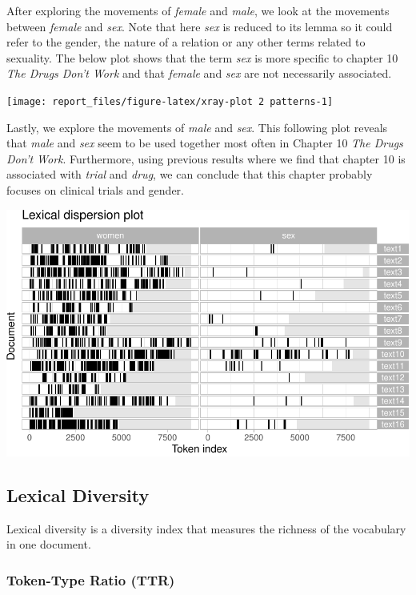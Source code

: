 \documentclass[
]{article}
\begin{document}
After exploring the movements of \emph{female} and \emph{male}, we look
at the movements between \emph{female} and \emph{sex}. Note that here
\emph{sex} is reduced to its lemma so it could refer to the gender, the
nature of a relation or any other terms related to sexuality. The below
plot shows that the term \emph{sex} is more specific to chapter 10
\emph{The Drugs Don't Work} and that \emph{female} and \emph{sex} are
not necessarily associated.

\begin{center}\texttt{[image: report\_files/figure-latex/xray-plot 2 patterns-1]} \end{center}

Lastly, we explore the movements of \emph{male} and \emph{sex}. This
following plot reveals that \emph{male} and \emph{sex} seem to be used
together most often in Chapter 10 \emph{The Drugs Don't Work}.
Furthermore, using previous results where we find that chapter 10 is
associated with \emph{trial} and \emph{drug}, we can conclude that this
chapter probably focuses on clinical trials and gender.

\begin{center}\includegraphics[width=0.7\linewidth]{report_files/figure-latex/xray plot 2 patterns-1} \end{center}

\hypertarget{lexical-diversity}{%
\subsection{Lexical Diversity}\label{lexical-diversity}}

Lexical diversity is a diversity index that measures the richness of the
vocabulary in one document.

\hypertarget{token-type-ratio-ttr}{%
\subsubsection{Token-Type Ratio (TTR)}\label{token-type-ratio-ttr}}
\end{document}
